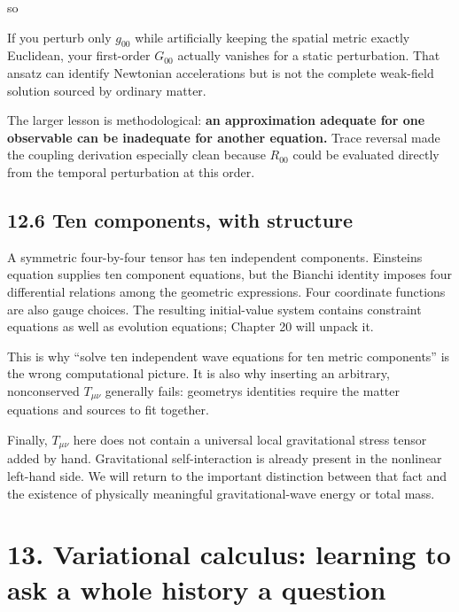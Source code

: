\documentclass[
  11pt,
  letterpaper,
  oneside,
  openany]{scrbook}
\begin{document}
so

\begin{center}
\begingroup
{}
\ifdim\wd\grmathbox>\linewidth
\resizebox{\linewidth}{!}{\usebox{\grmathbox}}
\else\usebox{\grmathbox}\fi
\endgroup
\end{center}

If you perturb only \(g_{00}\) while artificially keeping the spatial
metric exactly Euclidean, your first-order \(G_{00}\) actually vanishes
for a static perturbation. That ansatz can identify Newtonian
accelerations but is not the complete weak-field solution sourced by
ordinary matter.

The larger lesson is methodological: \textbf{an approximation adequate
for one observable can be inadequate for another equation.} Trace
reversal made the coupling derivation especially clean because
\(R_{00}\) could be evaluated directly from the temporal perturbation at
this order.

\hypertarget{ten-components-with-structure}{%
\section{12.6 Ten components, with
structure}\label{ten-components-with-structure}}

A symmetric four-by-four tensor has ten independent components.
Einstein\textquotesingle s equation supplies ten component equations,
but the Bianchi identity imposes four differential relations among the
geometric expressions. Four coordinate functions are also gauge choices.
The resulting initial-value system contains constraint equations as well
as evolution equations; Chapter 20 will unpack it.

This is why ``solve ten independent wave equations for ten metric
components'' is the wrong computational picture. It is also why
inserting an arbitrary, nonconserved \(T_{\mu\nu}\) generally fails:
geometry\textquotesingle s identities require the matter equations and
sources to fit together.

Finally, \(T_{\mu\nu}\) here does not contain a universal local
gravitational stress tensor added by hand. Gravitational
self-interaction is already present in the nonlinear left-hand side. We
will return to the important distinction between that fact and the
existence of physically meaningful gravitational-wave energy or total
mass.

\hypertarget{chapter-13}{%
\chapter{13. Variational calculus: learning to ask a whole history a
question}\label{chapter-13}}
\end{document}
